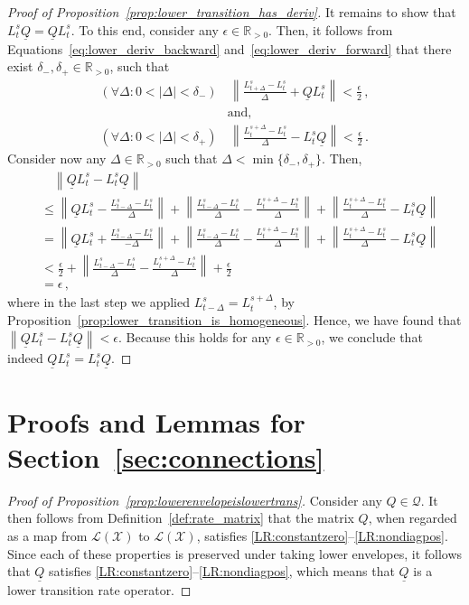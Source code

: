 \documentclass[10pt]{paper}
\theoremstyle{definition}
\newcommand{\reals}{\mathbb{R}}
\newcommand{\realspos}{\reals_{>0}}
\newcommand{\states}{\mathcal{X}}
\newcommand{\gambles}{\mathcal{L}}
\newcommand{\gamblesX}{\gambles(\states)}
\newcommand{\rateset}{\mathcal{Q}}
\newcommand{\lrate}{\underline{Q}}
\newcommand{\norm}[1]{\left\lVert #1 \right\rVert}
\newcommand{\abs}[1]{\left\vert #1 \right\vert}
\begin{document}
\begin{proof}[Proof of Proposition~\ref{prop:lower_transition_has_deriv}]
It remains to show that $L_t^s\lrate=\lrate L_t^s$. To this end, consider any $\epsilon\in\realspos$. Then, it follows from Equations~\eqref{eq:lower_deriv_backward} and~\eqref{eq:lower_deriv_forward} that there exist $\delta_-,\delta_+\in\realspos$, such that
\begin{align*}
(\forall\Delta:0<\abs{\Delta}<\delta_-)&\,\norm{\frac{L_{t+\Delta}^s - L_t^s}{\Delta} + \lrate L_t^s} < \frac{\epsilon}{2}\,, \\
&\text{and,}\\
(\forall\Delta:0<\abs{\Delta}<\delta_+)&\,\norm{\frac{L_{t}^{s+\Delta} - L_t^s}{\Delta} - L_t^s\lrate} < \frac{\epsilon}{2}\,.
\end{align*}
Consider now any $\Delta\in\realspos$ such that $\Delta<\min\{\delta_-,\delta_+\}$. Then,
\begin{align*}
 &\quad \norm{\lrate L_t^s - L_t^s\lrate} \\
 &\leq \norm{\lrate L_t^s - \frac{L_{t-\Delta}^s - L_t^s}{\Delta}} + \norm{\frac{L_{t-\Delta}^s - L_t^s}{\Delta} - \frac{L_{t}^{s+\Delta} - L_t^s}{\Delta}} + \norm{\frac{L_{t}^{s+\Delta} - L_t^s}{\Delta} - L_t^s\lrate} \\
 &= \norm{\lrate L_t^s + \frac{L_{t-\Delta}^s - L_t^s}{-\Delta}} + \norm{\frac{L_{t-\Delta}^s - L_t^s}{\Delta} - \frac{L_{t}^{s+\Delta} - L_t^s}{\Delta}} + \norm{\frac{L_{t}^{s+\Delta} - L_t^s}{\Delta} - L_t^s\lrate} \\
 &< \frac{\epsilon}{2} + \norm{\frac{L_{t-\Delta}^s - L_t^s}{\Delta} - \frac{L_{t}^{s+\Delta} - L_t^s}{\Delta}} + \frac{\epsilon}{2} \\
 &= \epsilon\,,
\end{align*}
where in the last step we applied $L_{t-\Delta}^s=L_t^{s+\Delta}$, by Proposition~\ref{prop:lower_transition_is_homogeneous}. Hence, we have found that $\norm{\lrate L_t^s - L_t^s\lrate}<\epsilon$. Because this holds for any $\epsilon\in\realspos$, we conclude that indeed $\lrate L_t^s=L_t^s\lrate$.
\end{proof}

\section{Proofs and Lemmas for Section~\ref{sec:connections}}

\begin{proof}[Proof of Proposition~\ref{prop:lowerenvelopeislowertrans}]
Consider any $Q\in\rateset$. It then follows from Definition~\ref{def:rate_matrix} that the matrix $Q$, when regarded as a map from $\gamblesX$ to $\gamblesX$, satisfies \ref{LR:constantzero}--\ref{LR:nondiagpos}. Since each of these properties is preserved under taking lower envelopes, it follows that $\lrate$ satisfies \ref{LR:constantzero}--\ref{LR:nondiagpos}, which means that $\lrate$ is a lower transition rate operator.
\end{proof}
\end{document}
